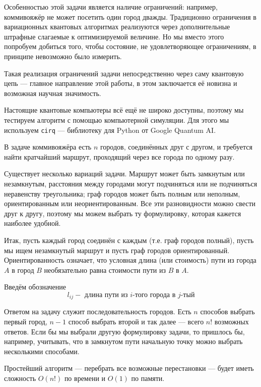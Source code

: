 Особенностью этой задачи является наличие ограничений: например, коммивояжёр не может посетить один город дважды. Традиционно ограничения в вариационных квантовых алгоритмах реализуются через дополнительные штрафные слагаемые к оптимизируемой величине. Но мы вместо этого попробуем добиться того, чтобы состояние, не удовлетворяющее ограничениям, в принципе невозможно было измерить.

Такая реализация ограничений задачи непосредственно через саму квантовую цепь --- главное направление этой работы, в этом заключается её новизна и возможная научная значимость.

Настоящие квантовые компьютеры всё ещё не широко доступны, поэтому мы тестируем алгоритм с помощью компьютерной симуляции. Для этого мы используем \texttt{cirq} --- библиотеку для Python от Google Quantum AI.



В задаче коммивояжёра есть $n$ городов, соединённых друг с другом, и требуется найти кратчайший маршрут, проходящий через все города по одному разу.

Существует несколько вариаций задачи. Маршрут может быть замкнутым или незамкнутым, расстояния между городами могут подчиняться или не подчиняться неравенству треугольника; граф городов может быть полным или неполным, ориентированным или неориентированным. Все эти разновидности можно свести друг к другу, поэтому мы можем выбрать ту формулировку, которая кажется наиболее удобной. 

Итак, пусть каждый город соединён с каждым (т.е. граф городов полный), пусть мы ищем незамкнутый маршрут и пусть граф городов ориентированный. Ориентированность означает, что условная длина (или стоимость) пути из города $A$ в город $B$ необязательно равна стоимости пути из $B$ в $A$.

Введём обозначение
\[
l_{ij} - \text{ длина пути из $i$-того города в $j$-тый}
\]

Ответом на задачу служит последовательность городов. Есть $n$ способов выбрать первый город, $n-1$ способ выбрать второй и так далее --- всего $n!$ возможных ответов. Если бы мы выбрали другую формулировку задачи, то пришлось бы, например, учитывать, что в замкнутом пути начальную точку можно выбрать несколькими способами.

Простейший алгоритм --- перебрать все возможные перестановки --- будет иметь сложность $O(n!)$ по времени и $O(1)$ по памяти.

